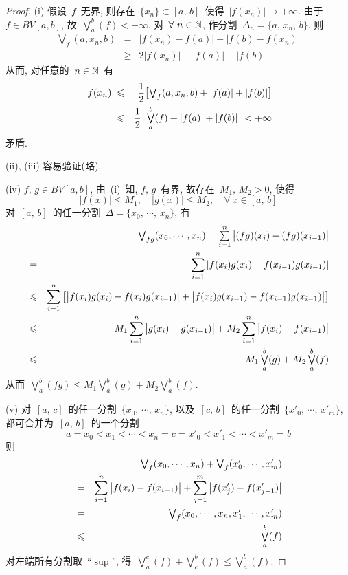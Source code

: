 \begin{proof}
(i) 假设~$f$~无界, 则存在~$\{x_n\} \subset [a,\,b]$~使得~$|f(x_n)| \to +\infty$. 由于~$f \in BV[a,b]$, 故~$\bigvee\limits_a^b(f) < +\infty$. 对~$\forall~n \in \mathbb{N}$, 作分割~$\Delta_n=\{a,\,x_n,\,b\}$. 则
\begin{eqnarray*}
\textstyle{\bigvee}_f(a,x_n,b) &=& |f(x_n) - f(a)| + |f(b) - f(x_n)| \\
&\geqslant& 2|f(x_n)| - |f(a)| - |f(b)|
\end{eqnarray*}
从而, 对任意的~$n \in \mathbb{N}$~有
\begin{eqnarray*}
|f(x_n)| &\leqslant& \frac{1}{2} \big[\textstyle{\bigvee}_f(a,x_n,b) + |f(a)| + |f(b)| \big]\\
&\leqslant& \frac{1}{2} \big[\mathop{\textstyle{\bigvee}}\limits_a^b(f) + |f(a)| + |f(b)|\big] < +\infty
\end{eqnarray*}
矛盾.

(ii), (iii) 容易验证(略).

(iv) $f,\,g \in BV[a,b]$, 由~(i)~知, $f,\,g$~有界, 故存在~$M_1,\,M_2 > 0$, 使得
\[
|f(x)| \leqslant M_1, \quad |g(x)| \leqslant M_2, \quad \forall~x \in [a,\,b]
\]
对~$[a,\,b]$~的任一分割~$\Delta = \{x_0,\,\cdots,\,x_n\}$, 有
\begin{eqnarray*}
&&\textstyle{\bigvee}_{fg}(x_0,\cdots,x_n) = \sum\limits_{i=1}^n \big| (fg)(x_i)-(fg)(x_{i-1}) \big| \\
&=& \sum_{i=1}^n |f(x_i)g(x_i) - f(x_{i-1})g(x_{i-1})| \\
&\leqslant& \sum_{i=1}^n \big[\big| f(x_i)g(x_i) - f(x_i)g(x_{i-1}) \big| + \big| f(x_i)g(x_{i-1}) - f(x_{i-1})g(x_{i-1}) \big|\big] \\
&\leqslant& M_1 \sum_{i=1}^n \big|g(x_i) - g(x_{i-1})\big| + M_2 \sum_{i=1}^n \big|f(x_i) - f(x_{i-1})\big| \\
&\leqslant& M_1 \mathop{\textstyle{\bigvee}}\limits_a^b(g) + M_2 \mathop{\textstyle{\bigvee}}\limits_a^b(f)
\end{eqnarray*}
从而~$\bigvee\limits_a^b(fg) \leqslant M_1 \bigvee\limits_a^b(g) + M_2 \bigvee\limits_a^b(f)$.

\medskip

(v) 对~$[a,\,c]$~的任一分割~$\{x_0,\,\cdots,\,x_n\}$, 以及~$[c,\,b]$~的任一分割~$\{x'_0,\,\cdots,\,x'_m\}$, 都可合并为~$[a,\,b]$~的一个分割
\[
a = x_0 < x_1 < \cdots < x_n = c = x'_0 < x'_1 < \cdots < x'_m = b
\]
则
\begin{eqnarray*}
&&\textstyle{\bigvee}_{f}(x_0,\cdots,x_n) + \textstyle{\bigvee}_{f}(x'_0,\cdots,x'_m) \\
&=& \sum_{i=1}^n \big|f(x_i)-f(x_{i-1})\big| + \sum_{j=1}^m \big|f(x'_j)-f(x'_{j-1})\big| \\
&=& \textstyle{\bigvee}_{f}(x_0,\cdots,x_n,x'_1,\cdots,x'_m) \\
&\leqslant& \mathop{\textstyle{\bigvee}}\limits_a^b(f)
\end{eqnarray*}
对左端所有分割取~``$\sup$'', 得~$\bigvee\limits_a^c(f) + \bigvee\limits_c^b(f) \leqslant \bigvee\limits_a^b(f)$.


\end{proof}
